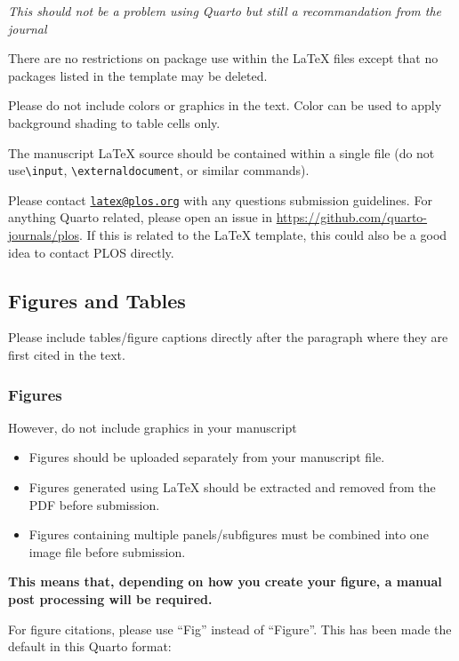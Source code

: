 \documentclass[
  10pt,
  letterpaper,
]{article}
\providecommand{\tightlist}{%
  \setlength{\itemsep}{0pt}\setlength{\parskip}{0pt}}
\begin{document}
\emph{This should not be a problem using Quarto but still a
recommandation from the journal}

There are no restrictions on package use within the LaTeX files except
that no packages listed in the template may be deleted.

Please do not include colors or graphics in the text. Color can be used
to apply background shading to table cells only.

The manuscript LaTeX source should be contained within a single file (do
not use\texttt{\textbackslash{}input},
\texttt{\textbackslash{}externaldocument}, or similar commands).

Please contact \href{mailto:latex@plos.org}{\nolinkurl{latex@plos.org}}
with any questions submission guidelines. For anything Quarto related,
please open an issue in \url{https://github.com/quarto-journals/plos}.
If this is related to the LaTeX template, this could also be a good idea
to contact PLOS directly.

\subsection{Figures and Tables}\label{figures-and-tables}

Please include tables/figure captions directly after the paragraph where
they are first cited in the text.

\subsubsection{Figures}\label{figures}

However, do not include graphics in your manuscript

\begin{itemize}
\tightlist
\item
  Figures should be uploaded separately from your manuscript file.
\item
  Figures generated using LaTeX should be extracted and removed from the
  PDF before submission.
\item
  Figures containing multiple panels/subfigures must be combined into
  one image file before submission.
\end{itemize}

\textbf{This means that, depending on how you create your figure, a
manual post processing will be required.}

For figure citations, please use ``Fig'' instead of ``Figure''. This has
been made the default in this Quarto format:
\end{document}
